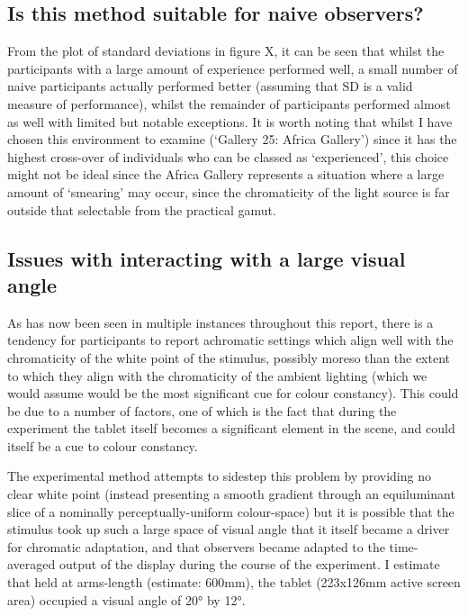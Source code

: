 \subsection{Is this method suitable for naive observers?}


From the plot of standard deviations in figure X, it can be seen that whilst the participants with a large amount of experience performed well, a small number of naive participants actually performed better (assuming that SD is a valid measure of performance), whilst the remainder of participants performed almost as well with limited but notable exceptions. It is worth noting that whilst I have chosen this environment to examine (`Gallery 25: Africa Gallery') since it has the highest cross-over of individuals who can be classed as `experienced', this choice might not be ideal since the Africa Gallery represents a situation where a large amount of `smearing' may occur, since the chromaticity of the light source is far outside that selectable from the practical gamut.

\subsection{Issues with interacting with a large visual angle}

As has now been seen in multiple instances throughout this report, there is a tendency for participants to report achromatic settings which align well with the chromaticity of the white point of the stimulus, possibly moreso than the extent to which they align with the chromaticity of the ambient lighting (which we would assume would be the most significant cue for colour constancy). This could be due to a number of factors, one of which is the fact that during the experiment the tablet itself becomes a significant element in the scene, and could itself be a cue to colour constancy. 

The experimental method attempts to sidestep this problem by providing no clear white point (instead presenting a smooth gradient through an equiluminant slice of a nominally perceptually-uniform colour-space) but it is possible that the stimulus took up such a large space of visual angle that it itself became a driver for chromatic adaptation, and that observers became adapted to the time-averaged output of the display during the course of the experiment. I estimate that held at arms-length (estimate: 600mm), the tablet (223x126mm active screen area) occupied a visual angle of 20° by 12°.

